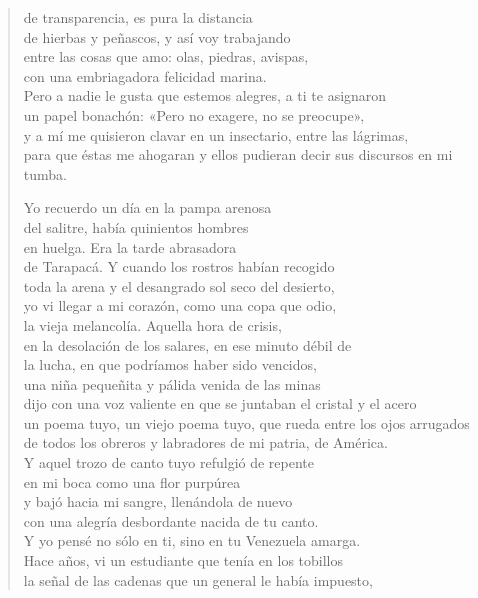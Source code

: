 \documentclass[12pt]{article}
\begin{document}
\begin{verse}
de transparencia, es pura la distancia\\
de hierbas y peñascos, y así voy trabajando\\
entre las cosas que amo: olas, piedras, avispas,\\
con una embriagadora felicidad marina.\\
Pero a nadie le gusta que estemos alegres, a ti te asignaron\\
un papel bonachón: «Pero no exagere, no se preocupe»,\\
y a mí me quisieron clavar en un insectario, entre las lágrimas,\\
para que éstas me ahogaran y ellos pudieran decir sus discursos en mi tumba.  

Yo recuerdo un día en la pampa arenosa\\
del salitre, había quinientos hombres\\
en huelga. Era la tarde abrasadora\\
de Tarapacá. Y cuando los rostros habían recogido\\
toda la arena y el desangrado sol seco del desierto,\\
yo vi llegar a mi corazón, como una copa que odio,\\
la vieja melancolía. Aquella hora de crisis,\\
en la desolación de los salares, en ese minuto débil de\\
la lucha, en que podríamos haber sido vencidos,\\
una niña pequeñita y pálida venida de las minas\\
dijo con una voz valiente en que se juntaban el cristal y el acero\\
un poema tuyo, un viejo poema tuyo, que rueda entre los ojos arrugados\\
de todos los obreros y labradores de mi patria, de América.\\
Y aquel trozo de canto tuyo refulgió de repente\\
en mi boca como una flor purpúrea\\
y bajó hacia mi sangre, llenándola de nuevo\\
con una alegría desbordante nacida de tu canto.\\
Y yo pensé no sólo en ti, sino en tu Venezuela amarga.\\
Hace años, vi un estudiante que tenía en los tobillos\\
la señal de las cadenas que un general le había impuesto,\\

\end{verse}
\end{document}
